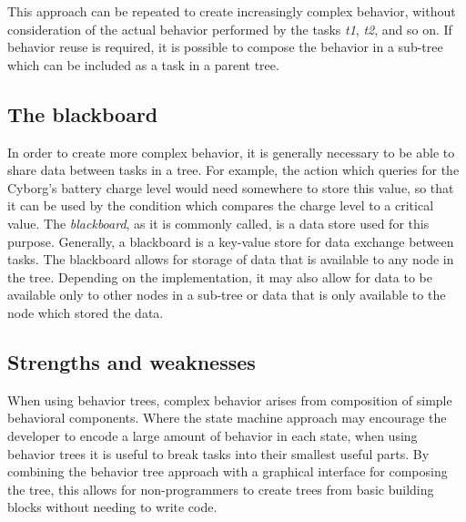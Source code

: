 \documentclass[\rootfolder/main.tex]{subfiles}
\begin{document}
This approach can be repeated to create increasingly complex behavior, without consideration of the actual behavior performed by the tasks \emph{t1}, \emph{t2}, and so on.
If behavior reuse is required, it is possible to compose the behavior in a sub-tree which can be included as a task in a parent tree.


\subsection{The blackboard}

In order to create more complex behavior, it is generally necessary to be able to share data between tasks in a tree.
For example, the action which queries for the Cyborg's battery charge level would need somewhere to store this value, so that it can be used by the condition which compares the charge level to a critical value.
The \emph{blackboard}, as it is commonly called, is a data store used for this purpose.
Generally, a blackboard is a key-value store for data exchange between tasks.
The blackboard allows for storage of data that is available to any node in the tree.
Depending on the implementation, it may also allow for data to be available only to other nodes in a sub-tree or data that is only available to the node which stored the data.


\subsection{Strengths and weaknesses}

When using behavior trees, complex behavior arises from composition of simple behavioral components.
Where the state machine approach may encourage the developer to encode a large amount of behavior in each state, when using behavior trees it is useful to break tasks into their smallest useful parts.
By combining the behavior tree approach with a graphical interface for composing the tree, this allows for non-programmers to create trees from basic building blocks without needing to write code.
\end{document}
